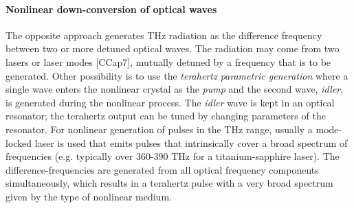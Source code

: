 \paragraph{Nonlinear down-conversion of optical waves}

The opposite approach generates THz radiation as the difference frequency between two or more detuned optical waves.
The radiation may come from two lasers or laser modes [CCap7], mutually detuned by a frequency that is to be generated. %
Other possibility is to use the \textit{terahertz parametric generation} where a single wave enters the nonlinear crystal as the \textit{pump} and the second wave, \textit{idler}, is generated during the nonlinear process. The \textit{idler} wave is kept in an optical resonator; the terahertz output can be tuned by changing parameters of the resonator. 
For nonlinear generation of pulses in the THz range, usually a mode-locked laser is used that emits pulses that intrinsically cover a broad spectrum of frequencies (e.g. typically over 360-390 THz for a titanium-sapphire laser). The difference-frequencies are generated from all optical frequency components simultaneously, which results in a terahertz pulse with a very broad spectrum given by the type of nonlinear medium. 

